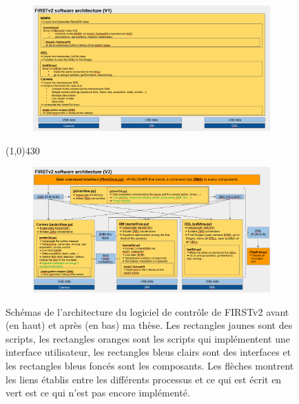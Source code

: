 \begin{figure}[ht!]
    \centering
    \begin{subfigure}{1\textwidth}
        \centering
        \includegraphics[width=\textwidth]{Figure_Chap2/SoftwareArchitecture_FIRSTv2_v1.png}
    \end{subfigure}
    \line(1,0){430}\\
    \begin{subfigure}{1\textwidth}
        \centering
        \includegraphics[width=\textwidth]{Figure_Chap2/SoftwareArchitecture_FIRSTv2_v2.png}
    \end{subfigure}
    \caption[Schémas de l'architecture du logiciel de contrôle de FIRSTv2 avant et après ma thèse.]{Schémas de l'architecture du logiciel de contrôle de FIRSTv2 avant (en haut) et après (en bas) ma thèse. Les rectangles jaunes sont des scripts, les rectangles oranges sont les scripts qui implémentent une interface utilisateur, les rectangles bleus clairs sont des interfaces et les rectangles bleus foncés sont les composants. Les flèches montrent les liens établis entre les différents processus et ce qui est écrit en vert est ce qui n'est pas encore implémenté.}
    \label{fig:SoftwareArchitecture}
\end{figure}

